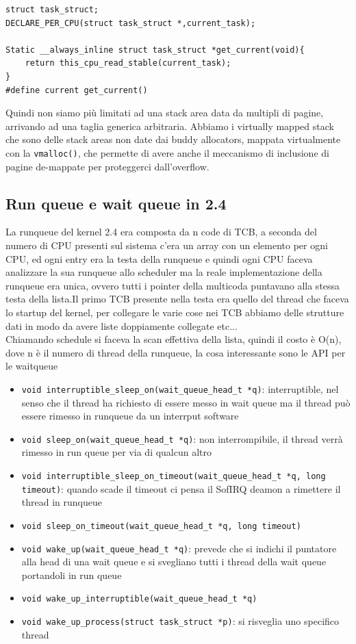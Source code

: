 \documentclass[12pt, oneside]{extbook}
\begin{document}
\begin{lstlisting}
struct task_struct;
DECLARE_PER_CPU(struct task_struct *,current_task);

Static __always_inline struct task_struct *get_current(void){
	return this_cpu_read_stable(current_task);
}
#define current get_current()
\end{lstlisting}
Quindi non siamo più limitati ad una stack area data da multipli di pagine, arrivando ad una taglia generica arbitraria. Abbiamo i virtually mapped stack che sono delle stack areas non date dai buddy allocators, mappata virtualmente con la \texttt{vmalloc()}, che permette di avere anche il meccanismo di inclusione di pagine de-mappate per proteggerci dall'overflow.
\subsection{Run queue e wait queue in 2.4}
La runqueue del kernel 2.4 era composta da n code di TCB, a seconda del numero di CPU presenti sul sistema c'era un array con un elemento per ogni CPU, ed ogni entry era la testa della runqueue e quindi ogni CPU faceva analizzare la sua runqueue allo scheduler ma la reale implementazione della runqueue era unica, ovvero tutti i pointer della multicoda puntavano alla stessa testa della lista.Il primo TCB presente nella testa era quello del thread che faceva lo startup del kernel, per collegare le varie cose nei TCB abbiamo delle strutture dati in modo da avere liste doppiamente collegate etc...\\Chiamando schedule si faceva la scan effettiva della lista, quindi il costo è O(n), dove n è il numero di thread della runqueue, la cosa interessante sono le API per le waitqueue
\begin{itemize}
\item \texttt{void interruptible\_sleep\_on(wait\_queue\_head\_t *q)}: interruptible, nel senso che il thread ha richiesto di essere messo in wait queue ma il thread può essere rimesso in runqueue da un interrput software
\item \texttt{void sleep\_on(wait\_queue\_head\_t *q)}: non interrompibile, il thread verrà rimesso in run queue per via di qualcun altro
\item \texttt{void interruptible\_sleep\_on\_timeout(wait\_queue\_head\_t *q, long timeout)}: quando scade il timeout ci pensa il SofIRQ deamon a rimettere il thread in runqueue
\item \texttt{void sleep\_on\_timeout(wait\_queue\_head\_t *q, long timeout)}
\item \texttt{void wake\_up(wait\_queue\_head\_t *q)}: prevede che si indichi il puntatore alla head di una wait queue e si svegliano tutti i thread della wait queue portandoli in run queue
\item \texttt{void wake\_up\_interruptible(wait\_queue\_head\_t *q)}
\item \texttt{void wake\_up\_process(struct task\_struct *p)}: si risveglia uno specifico thread
\end{itemize}
\end{document}
